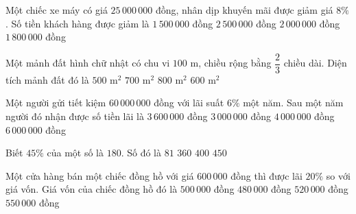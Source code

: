 \begin{ex} %
Một chiếc xe máy có giá $25\,000\,000$ đồng, nhân dịp khuyến mãi được giảm giá $8\%$. Số tiền khách hàng được giảm là
\choice
{$1\,500\,000$ đồng}
{$2\,500\,000$ đồng}
{\True $2\,000\,000$ đồng}
{$1\,800\,000$ đồng}
\end{ex}

\begin{ex} %
Một mảnh đất hình chữ nhật có chu vi $100\text{ m}$, chiều rộng bằng $\dfrac{2}{3}$ chiều dài. Diện tích mảnh đất đó là
\choice
{$500\text{ m}^2$}
{$700\text{ m}^2$}
{$800\text{ m}^2$}
{\True $600\text{ m}^2$}
\end{ex}

\begin{ex} %
Một người gửi tiết kiệm $60\,000\,000$ đồng với lãi suất $6\%$ một năm. Sau một năm người đó nhận được số tiền lãi là
\choice
{\True $3\,600\,000$ đồng}
{$3\,000\,000$ đồng}
{$4\,000\,000$ đồng}
{$6\,000\,000$ đồng}
\end{ex}

\begin{ex} %
Biết $45\%$ của một số là $180$. Số đó là
\choice
{$81$}
{$360$}
{\True $400$}
{$450$}
\end{ex}

\begin{ex} %
Một cửa hàng bán một chiếc đồng hồ với giá $600\,000$ đồng thì được lãi $20\%$ so với giá vốn. Giá vốn của chiếc đồng hồ đó là
\choice
{\True $500\,000$ đồng}
{$480\,000$ đồng}
{$520\,000$ đồng}
{$550\,000$ đồng}
\end{ex}

